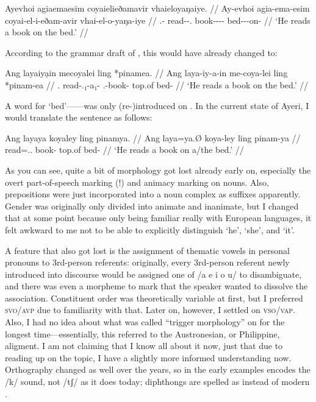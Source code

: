 \ex\begingl
	\gla Ayevhoi agiaemaesim coyaielieðamavir vhaieloyaŋaiye. //
	\glb Ay-evhoi agia-ema-esim coyai-el-i-eðam-avir vhai-el-o-yaŋa-iye //
	\glc \Tsg{}.\An{}-\Sbj{} read-\Vb{}-\Sbj{}.\An{} book-\Nn{}-\An{}-\Indf{}-\Parg{} bed-\Nn{}-\Inan{}-on-\Loc{} //
	\glft `He reads a book on the bed.' //
\endgl\xe

According to the grammar draft of , this would have already 
changed to:

\ex\begingl
	\gla Ang layaiyạin mecoyalei ling *pinamea. //
	\glb Ang laya-iy-a-in me-coya-lei ling *pinam-ea //
	\glc \Aarg{}.\Sbj{} read-\Tsg{}.\An{}₁-a₁-\Sbj{} \Indf{}.\Inan{}-book-\PargI{} top.of bed-\Loc{} //
	\glft `He reads a book on the bed.' //
\endgl\xe

A word for `bed'------was only (re-)introduced on 
. In the current state of Ayeri, I would translate the 
sentence as follows:

\ex\begingl
	\gla Ang layaya koyaley ling pinamya. //
	\glb Ang laya=ya.Ø koya-ley ling pinam-ya //
	\glc \AgtT{} read=\Tsg{}.\M{}.\Top{} book-\PargI{} top.of bed-\Loc{} //
	\glft `He reads a book on a/the bed.' //
\endgl\xe

As you can see, quite a bit of morphology got lost already early on, especially 
the overt part-of-speech marking (!) and animacy marking on nouns. Also, 
prepositions were just incorporated into a noun complex as suffixes apparently. 
Gender was originally only divided into animate and inanimate, but I changed 
that at some point because only being familiar really with European languages, 
it felt awkward to me not to be able to explicitly distinguish `he', `she', and 
`it'.

A feature that also got lost is the assignment of thematic vowels in personal 
pronouns to 3rd-person referents: originally, every 3rd-person referent newly 
introduced into discourse would be assigned one of /a e i o u/ to disambiguate, 
and there was even a morpheme to mark that the speaker wanted to dissolve the 
association. Constituent order was theoretically variable at first, but I 
preferred \textsc{svo/avp} due to familiarity with that. Later on, however, I 
settled on \textsc{vso/vap}. Also, I had no idea about what was called 
``trigger morphology'' on  for the longest time---essentially, 
this referred to the Austronesian, or Philippine, aligment. I am not claiming 
that I know all about it now, just that due to reading up on the topic, I have 
a slightly more informed understanding now. Orthography changed as well over 
the years, so  in the early examples encodes the /k/ sound, not /tʃ/ as 
it does today; diphthongs are spelled as  instead of modern .


